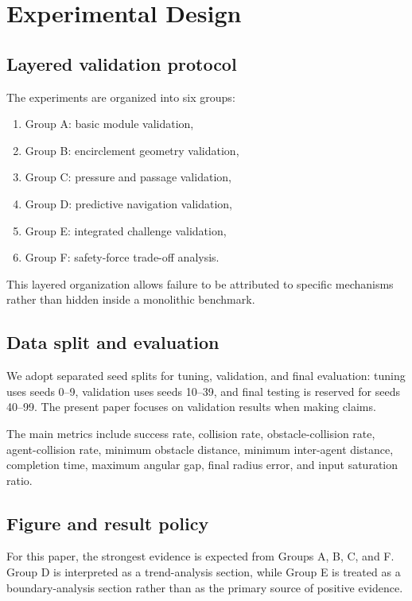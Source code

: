 \documentclass[utf8]{FrontiersinHarvard}
\begin{document}
\section{Experimental Design}

\subsection{Layered validation protocol}

The experiments are organized into six groups:

\begin{enumerate}
    \item Group A: basic module validation,
    \item Group B: encirclement geometry validation,
    \item Group C: pressure and passage validation,
    \item Group D: predictive navigation validation,
    \item Group E: integrated challenge validation,
    \item Group F: safety-force trade-off analysis.
\end{enumerate}

This layered organization allows failure to be attributed to specific mechanisms rather than hidden inside a monolithic benchmark.

\subsection{Data split and evaluation}

We adopt separated seed splits for tuning, validation, and final evaluation: tuning uses seeds 0--9, validation uses seeds 10--39, and final testing is reserved for seeds 40--99. The present paper focuses on validation results when making claims.

The main metrics include success rate, collision rate, obstacle-collision rate, agent-collision rate, minimum obstacle distance, minimum inter-agent distance, completion time, maximum angular gap, final radius error, and input saturation ratio.

\subsection{Figure and result policy}

For this paper, the strongest evidence is expected from Groups A, B, C, and F. Group D is interpreted as a trend-analysis section, while Group E is treated as a boundary-analysis section rather than as the primary source of positive evidence.
\end{document}
